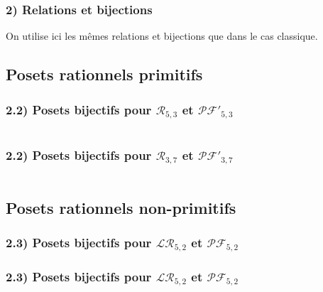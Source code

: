 \documentclass{beamer}
\begin{document}
\begin{frame} %
    \frametitle{2) Relations et bijections}
    On utilise ici les mêmes relations et bijections que dans le cas
    classique.
\end{frame}

\subsection{Posets rationnels primitifs}

\begin{frame} %
    \frametitle{2.2) Posets \textbf{bijectifs} pour $\mathcal{R}_{5,3}$ et
        $\mathcal{PF'}_{5,3}$}
        \begin{columns}
            \begin{column}{0.35\textwidth}
                
            \end{column}
            \begin{column}{0.65\textwidth}
                
            \end{column}
        \end{columns}
\end{frame}

\begin{frame} %
    \frametitle{2.2) Posets \textbf{bijectifs} pour $\mathcal{R}_{3,7}$ et
        $\mathcal{PF'}_{3,7}$}
        \begin{columns}
            \begin{column}{0.5\textwidth}
                
            \end{column}
            \begin{column}{0.5\textwidth}
                
            \end{column}
        \end{columns}
\end{frame}

\subsection{Posets rationnels non-primitifs}

\begin{frame} %
    \frametitle{2.3) Posets \textbf{bijectifs} pour $\mathcal{LR}_{5,2}$ et
        $\mathcal{PF}_{5,2}$}
        
\end{frame}

\begin{frame} %
    \frametitle{2.3) Posets \textbf{bijectifs} pour $\mathcal{LR}_{5,2}$ et
        $\mathcal{PF}_{5,2}$}
        
\end{frame}
\end{document}
